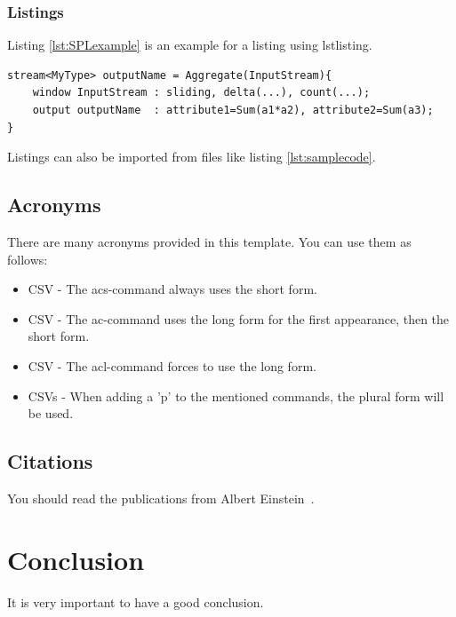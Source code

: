 \subsubsection{Listings}
\label{sec:Listings}

Listing \ref{lst:SPLexample} is an example for a listing using lstlisting.

\begin{lstlisting}[float=b,label=lst:SPLexample,caption={An IBM SPL code example}]
stream<MyType> outputName = Aggregate(InputStream){
	window InputStream : sliding, delta(...), count(...);
	output outputName  : attribute1=Sum(a1*a2), attribute2=Sum(a3);
}
\end{lstlisting}

Listings can also be imported from files like listing \ref{lst:samplecode}.


\subsection{Acronyms}
\label{sec:Acronyms}

There are many acronyms provided in this template. You can use them as follows:
\begin{itemize}
	\item \acs{CSV} - The acs-command always uses the short form.
	\item \ac{CSV} - The ac-command uses the long form for the first appearance, then the short form.
	\item \acl{CSV} - The acl-command forces to use the long form.
	\item \acp{CSV} - When adding a 'p' to the mentioned commands, the plural form will be used.
\end{itemize}

\subsection{Citations}
You should read the publications from Albert Einstein~\cite{einstein1920relativity}.

\section{Conclusion}
\label{sec:Conclusion}

It is very important to have a good conclusion.
